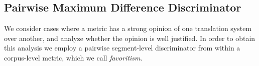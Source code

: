 
\subsection{Pairwise Maximum Difference Discriminator}

We consider cases where a metric has a strong opinion of one translation system over another, and analyze whether the opinion is well justified. In order to obtain this analysis we employ a pairwise segment-level discriminator from within a corpus-level metric, which we call \textit{favoritism}.




    
